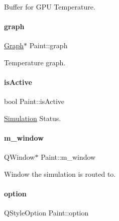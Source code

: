 Buffer for G\+PU Temperature. 

\mbox{\label{classPaint_a7c4451334289c681e3763ba244227b7a}} 
\paragraph{\texorpdfstring{graph}{graph}}
{\footnotesize\ttfamily \mbox{\hyperlink{classGraph}{Graph}}$\ast$ Paint\+::graph\hspace{0.3cm}{\ttfamily [private]}}



Temperature graph. 

\mbox{\label{classPaint_ad3674af36118608e17d5f49812f0e398}} 
\paragraph{\texorpdfstring{isActive}{isActive}}
{\footnotesize\ttfamily bool Paint\+::is\+Active\hspace{0.3cm}{\ttfamily [private]}}



\mbox{\hyperlink{classSimulation}{Simulation}} Status. 

\mbox{\label{classPaint_a12c0d1f2f57bd3aea9388f42aa6434f8}} 
\paragraph{\texorpdfstring{m\_window}{m\_window}}
{\footnotesize\ttfamily Q\+Window$\ast$ Paint\+::m\+\_\+window\hspace{0.3cm}{\ttfamily [private]}}



Window the simulation is routed to. 

\mbox{\label{classPaint_ac0f5a8dc0d272705bd7251867e8eabf2}} 
\paragraph{\texorpdfstring{option}{option}}
{\footnotesize\ttfamily Q\+Style\+Option Paint\+::option\hspace{0.3cm}{\ttfamily [private]}}



